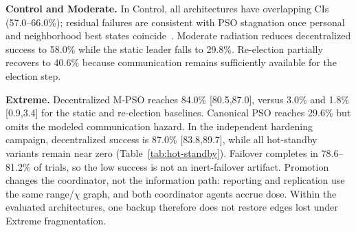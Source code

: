 \documentclass[conference]{IEEEtran}
\begin{document}
\textbf{Control and Moderate.} In Control, all architectures have overlapping CIs (57.0--66.0\%); residual failures are consistent with PSO stagnation once personal and neighborhood best states coincide~\cite{van_den_bergh_2002}. Moderate radiation reduces decentralized success to 58.0\% while the static leader falls to 29.8\%. Re-election partially recovers to 40.6\% because communication remains sufficiently available for the election step.

\textbf{Extreme.} Decentralized M-PSO reaches 84.0\% [80.5,87.0], versus 3.0\% and 1.8\% [0.9,3.4] for the static and re-election baselines. Canonical PSO reaches 29.6\% but omits the modeled communication hazard. In the independent hardening campaign, decentralized success is 87.0\% [83.8,89.7], while all hot-standby variants remain near zero (Table~\ref{tab:hot-standby}). Failover completes in 78.6--81.2\% of trials, so the low success is not an inert-failover artifact. Promotion changes the coordinator, not the information path: reporting and replication use the same range/$\chi$ graph, and both coordinator agents accrue dose. Within the evaluated architectures, one backup therefore does not restore edges lost under Extreme fragmentation.
\end{document}
